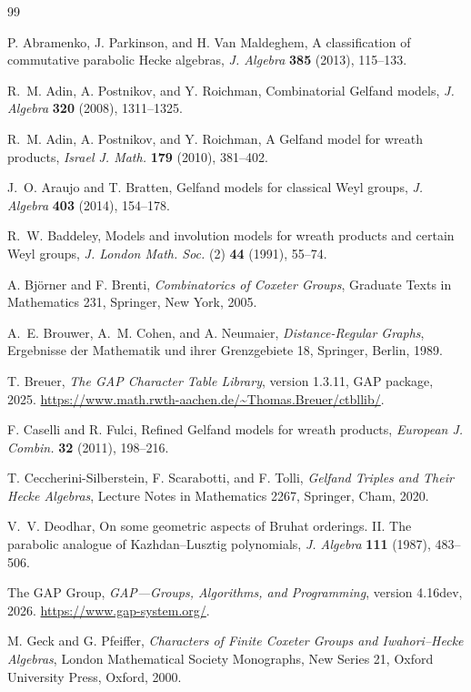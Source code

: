 \documentclass[11pt]{article}
\numberwithin{equation}{section}
\theoremstyle{definition}
\begin{document}
\begin{thebibliography}{99}

P. Abramenko, J. Parkinson, and H. Van Maldeghem,
A classification of commutative parabolic Hecke algebras,
\emph{J. Algebra} \textbf{385} (2013), 115--133.

R.~M. Adin, A. Postnikov, and Y. Roichman,
Combinatorial Gelfand models,
\emph{J. Algebra} \textbf{320} (2008), 1311--1325.

R.~M. Adin, A. Postnikov, and Y. Roichman,
A Gelfand model for wreath products,
\emph{Israel J. Math.} \textbf{179} (2010), 381--402.

J.~O. Araujo and T. Bratten,
Gelfand models for classical Weyl groups,
\emph{J. Algebra} \textbf{403} (2014), 154--178.

R.~W. Baddeley,
Models and involution models for wreath products and certain Weyl groups,
\emph{J. London Math. Soc.} (2) \textbf{44} (1991), 55--74.

A. Bj\"orner and F. Brenti,
\emph{Combinatorics of Coxeter Groups},
Graduate Texts in Mathematics 231, Springer, New York, 2005.

A.~E. Brouwer, A.~M. Cohen, and A. Neumaier,
\emph{Distance-Regular Graphs},
Ergebnisse der Mathematik und ihrer Grenzgebiete 18, Springer, Berlin, 1989.

T. Breuer,
\emph{The GAP Character Table Library}, version 1.3.11,
GAP package, 2025.
\url{https://www.math.rwth-aachen.de/~Thomas.Breuer/ctbllib/}.

F. Caselli and R. Fulci,
Refined Gelfand models for wreath products,
\emph{European J. Combin.} \textbf{32} (2011), 198--216.

T. Ceccherini-Silberstein, F. Scarabotti, and F. Tolli,
\emph{Gelfand Triples and Their Hecke Algebras},
Lecture Notes in Mathematics 2267, Springer, Cham, 2020.

V.~V. Deodhar,
On some geometric aspects of Bruhat orderings. II. The parabolic analogue of Kazhdan--Lusztig polynomials,
\emph{J. Algebra} \textbf{111} (1987), 483--506.

The GAP Group,
\emph{GAP---Groups, Algorithms, and Programming}, version 4.16dev, 2026.
\url{https://www.gap-system.org/}.

M. Geck and G. Pfeiffer,
\emph{Characters of Finite Coxeter Groups and Iwahori--Hecke Algebras},
London Mathematical Society Monographs, New Series 21,
Oxford University Press, Oxford, 2000.


\end{thebibliography}
\end{document}
